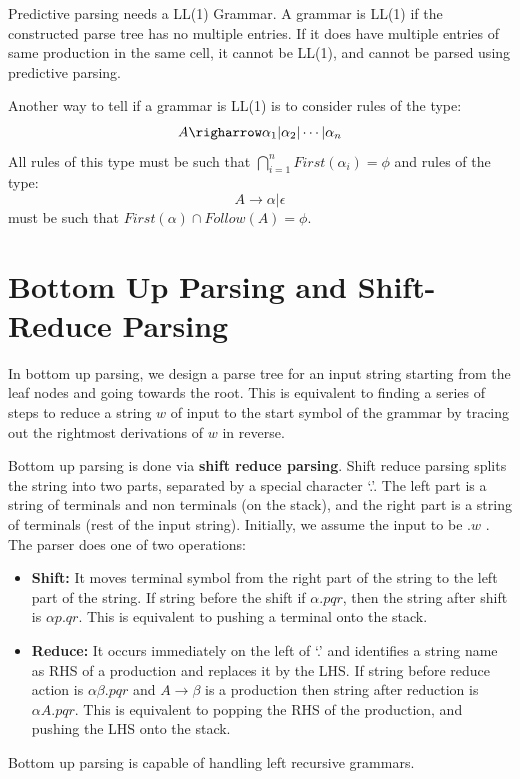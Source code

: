 \documentclass[12pt,letterpaper]{amsbook}
\theoremstyle{definition}
\begin{document}
Predictive parsing needs a LL(1) Grammar. A grammar is LL(1) if the constructed parse tree has no multiple entries. If it does have multiple entries of same production in the same cell, it cannot be LL(1), and cannot be parsed using predictive parsing.

Another way to tell if a grammar is LL(1) is to consider rules of the type:
\[A \righarrow \alpha_1 | \alpha_2 | \cdots | \alpha_n\]
All rules of this type must be such that $\bigcap_{i=1}^n First(\alpha_i) = \phi$ and rules of the type:
\[A \rightarrow \alpha | \epsilon\]
must be such that $First(\alpha) \cap Follow(A) = \phi$.

\section{Bottom Up Parsing and Shift-Reduce Parsing}

In bottom up parsing, we design a parse tree for an input string starting from the leaf nodes and going towards the root. This is equivalent to finding a series of steps to reduce a string $w$ of input to the start symbol of the grammar by tracing out the rightmost derivations of $w$ in reverse.

Bottom up parsing is done via \textbf{shift reduce parsing}. Shift reduce parsing splits the string into two parts,  separated by a special character `.'. The left part is a string of terminals and non terminals (on the stack), and the right part is a string of terminals (rest of the input string). Initially, we assume the input to be $.w$ . The parser does one of two operations:

\begin{itemize}
  \item \textbf{Shift:} It moves terminal symbol from the right part of the string to the left part of the string. If string before the shift if $\alpha . pqr$, then the string after shift is $\alpha p . q r$. This is equivalent to pushing a terminal onto the stack.
  \item \textbf{Reduce:} It occurs immediately on the left of `.' and identifies a string name as RHS of a production and replaces it by the LHS. If string before reduce action is $\alpha \beta . p q r$ and $A \rightarrow \beta$ is a production then string after reduction is $\alpha A . pqr$. This is equivalent to popping the RHS of the production, and pushing the LHS onto the stack.
\end{itemize}

Bottom up parsing is capable of handling left recursive grammars.
\end{document}
